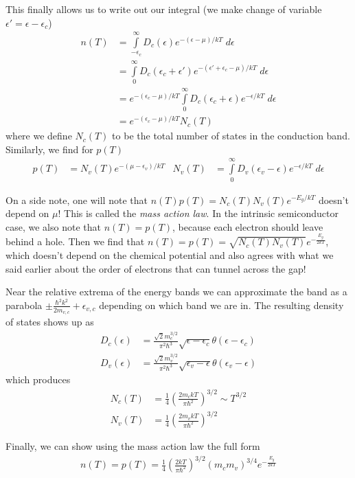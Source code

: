 \documentclass[10pt]{report}
\begin{document}
This finally allows us to write out our integral (we make change of variable $\epsilon' = \epsilon - \epsilon_c$)
\begin{align}
    n(T) &= \int\limits_{-\epsilon_c}^{\infty}D_c(\epsilon)e^{-(\epsilon - \mu)/kT}\;d\epsilon\\
    &= \int\limits_{0}^{\infty}D_c(\epsilon_c + \epsilon')e^{-(\epsilon' + \epsilon_c - \mu)/kT}\;d\epsilon\\
    &= e^{-(\epsilon_c - \mu)/kT} \int\limits_{0}^{\infty}D_c(\epsilon_c + \epsilon)e^{-\epsilon/kT}\;d\epsilon\\
    &= e^{-(\epsilon_c - \mu)/kT}N_c(T)
\end{align}
where we define $N_c(T)$ to be the total number of states in the conduction band. Similarly, we find for $p(T)$
\begin{align}
    p(T) &= N_v(T)e^{-(\mu - \epsilon_v)/kT} & N_v(T) &= \int\limits_{0}^{\infty}D_v(\epsilon_v - \epsilon)e^{-\epsilon/kT}\;d\epsilon
\end{align}

On a side note, one will note that $n(T)p(T) = N_c(T)N_v(T)e^{-E_g/kT}$ doesn't depend on $\mu$! This is called the \emph{mass action law}. In the intrinsic semiconductor case, we also note that $n(T) = p(T)$, because each electron should leave behind a hole. Then we find that $n(T) = p(T) = \sqrt{N_c(T)N_v(T)}e^{-\frac{E_g}{2kT}}$, which doesn't depend on the chemical potential and also agrees with what we said earlier about the order of electrons that can tunnel across the gap!

Near the relative extrema of the energy bands we can approximate the band as a parabola $\pm \frac{\hbar^2 k^2}{2m_{v,c}} + \epsilon_{v,c}$ depending on which band we are in. The resulting density of states shows up as
\begin{align}
    D_c(\epsilon) &= \frac{\sqrt{2}m_c^{3/2}}{\pi^2\hbar^3}\sqrt{\epsilon - \epsilon_c}\theta(\epsilon - \epsilon_c)\\
    D_v(\epsilon) &= \frac{\sqrt{2}m_v^{3/2}}{\pi^2\hbar^3}\sqrt{\epsilon_v - \epsilon}\theta(\epsilon_v - \epsilon)
\end{align}
which produces
\begin{align}
    N_c(T) &= \frac{1}{4}\left( \frac{2m_ckT}{\pi \hbar^2} \right)^{3/2} \sim T^{3/2}\\
    N_v(T) &= \frac{1}{4}\left( \frac{2m_vkT}{\pi \hbar^2} \right)^{3/2}
\end{align}

Finally, we can show using the mass action law the full form
\begin{align}
    n(T) = p(T) = \frac{1}{4}\left( \frac{2kT}{\pi \hbar^2} \right)^{3/2}\left( m_cm_v \right)^{3/4}e^{-\frac{E_g}{2kT}}
\end{align}
\end{document}
